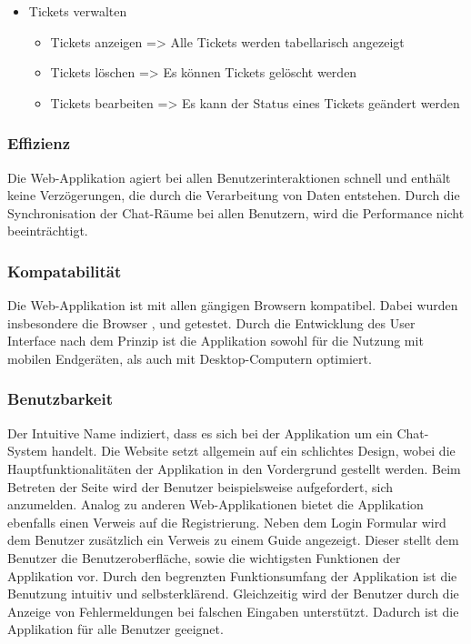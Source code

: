 \begin{itemize}
\begin{itemize}
\begin{itemize}
      \end{itemize}
    \item Tickets verwalten
      \begin{itemize}
        \item Tickets anzeigen
        \newline
        => Alle Tickets werden tabellarisch angezeigt
        \item Tickets löschen
        \newline
        => Es können Tickets gelöscht werden
        \item Tickets bearbeiten
        \newline
        => Es kann der Status eines Tickets geändert werden
      \end{itemize}  
    \end{itemize}   
\end{itemize}

\subsubsection{Effizienz}
Die Web-Applikation agiert bei allen Benutzerinteraktionen schnell und enthält keine Verzögerungen, die durch die Verarbeitung von Daten entstehen. 
Durch die Synchronisation der Chat-Räume bei allen Benutzern, wird die Performance nicht beeinträchtigt.

\subsubsection{Kompatabilität}\label{sec:Kompatibilitaet}
Die Web-Applikation  ist mit allen gängigen Browsern kompatibel.
Dabei wurden insbesondere die Browser ,  und  getestet.
Durch die Entwicklung des User Interface nach dem Prinzip  ist die Applikation sowohl für die Nutzung mit mobilen Endgeräten, als auch mit Desktop-Computern optimiert.

\subsubsection{Benutzbarkeit}
Der Intuitive Name  indiziert, dass es sich bei der Applikation um ein Chat-System handelt.
Die Website setzt allgemein auf ein schlichtes Design, wobei die Hauptfunktionalitäten der Applikation in den Vordergrund gestellt werden.
Beim Betreten der Seite wird der Benutzer beispielsweise aufgefordert, sich anzumelden.
Analog zu anderen Web-Applikationen bietet die Applikation ebenfalls einen Verweis auf die Registrierung.
Neben dem Login Formular wird dem Benutzer zusätzlich ein Verweis zu einem  Guide angezeigt.
Dieser stellt dem Benutzer die Benutzeroberfläche, sowie die wichtigsten Funktionen der Applikation vor.
\newparagraph
Durch den begrenzten Funktionsumfang der Applikation ist die Benutzung intuitiv und selbsterklärend.
Gleichzeitig wird der Benutzer durch die Anzeige von Fehlermeldungen bei falschen Eingaben unterstützt.
Dadurch ist die Applikation für alle Benutzer geeignet.

